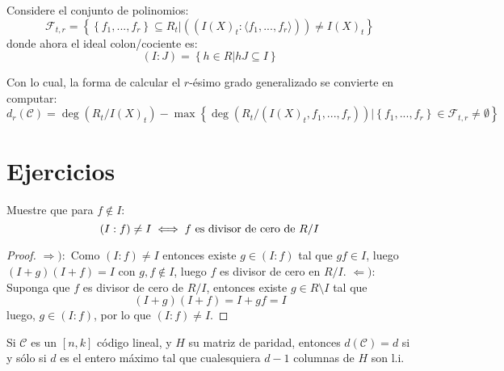 \documentclass[12pt]{report}
\theoremstyle{largebreak}
\begin{document}
    Considere el conjunto de polinomios:
    \begin{equation*}
        \mathcal{F}_{ t,r}=\left\{\left\{f_1,...,f_r \right\}\subseteq R_t \Big|((I(X)_t:\langle f_1,...,f_r\rangle))\neq I(X)_t \right\}
    \end{equation*}
    donde ahora el ideal colon/cociente es:
    \begin{equation*}
        (I:J)=\left\{h\in R\Big|hJ\subseteq I \right\}
    \end{equation*}

    Con lo cual, la forma de calcular el $r$-ésimo grado generalizado se convierte en computar:
    \begin{equation*}
        d_r(\mathcal{C})=\deg\left(R_t/I(X)_t \right)-\max\left\{\deg\left(R_t/(I(X)_t,f_1,...,f_r) \right)\Big|\left\{f_1,...,f_r \right\}\in\mathcal{F}_{ t,r}\neq\emptyset \right\}
    \end{equation*}

    \newpage

    \section{Ejercicios}

    \begin{excer}
        Muestre que para $f\notin I$:
        \begin{equation*}
            (I:f)\neq I\iff f\textup{ es divisor de cero de }R/I
        \end{equation*}
    \end{excer}

    \begin{proof}
        $\Rightarrow):$ Como $(I:f)\neq I$ entonces existe $g\in(I:f)$ tal que $gf\in I$, luego $(I+g)(I+f)=I$ con $g,f\notin I$, luego $f$ es divisor de cero en $R/I$.
        $\Leftarrow):$ Suponga que $f$ es divisor de cero de $R/I$, entonces existe $g\in R\setminus I$ tal que
        \begin{equation*}
            (I+g)(I+f)=I+gf=I
        \end{equation*}
        luego, $g\in(I:f)$, por lo que $(I:f)\neq I$.
    \end{proof}
    
    \begin{excer}
        Si $\mathcal{C}$ es un $[n,k]$ código lineal, y $H$ su matriz de paridad, entonces $d(\mathcal{C})=d$ si y sólo si $d$ es el entero máximo tal que cualesquiera $d-1$ columnas de $H$ son l.i.
    \end{excer}
\end{document}
